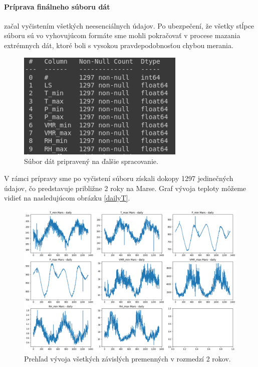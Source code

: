 \paragraph{Príprava finálneho súboru dát} začal vyčistením všetkých neesenciálnych údajov. Po ubezpečení, že všetky stĺpce súboru sú vo vyhovujúcom formáte sme mohli pokračovať v procese mazania extrémnych dát, ktoré boli s vysokou pravdepodobnosťou chybou merania. 
\begin{figure}[!htbp]
  \centering
  \includegraphics[width=8cm]{img/df_final.png}
  \caption{Súbor dát pripravený na ďalšie spracovanie.}
  \label{dest_abs_error}
\end{figure}
V rámci prípravy sme po vyčistení súboru získali dokopy 1297 jedinečných údajov, čo predstavuje približne 2 roky na Marse. Graf vývoja teploty môžeme vidieť na nasledujúcom obrázku \ref{dailyT}.
\begin{figure}[!htbp]
  \centering
  \includegraphics[width=14cm]{img/features1.png}
  \caption{Prehľad vývoja všetkých závislých premenných v rozmedzí 2 rokov.}
  \label{features1}
\end{figure}

